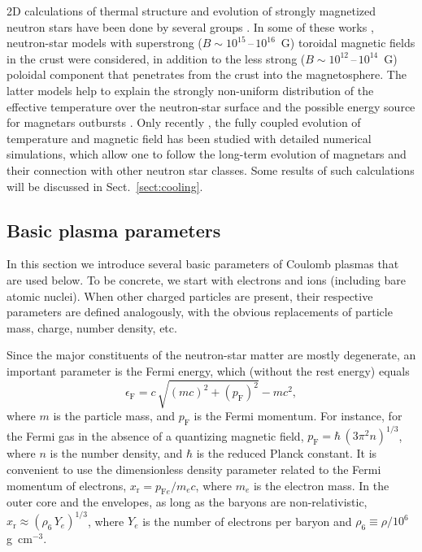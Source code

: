 \documentclass[smallextended]{svjour3}       %
\newcommand{\beq}{\begin{equation}}
\newcommand{\eeq}{\end{equation}}
\newcommand{\EF}{\epsilon_\mathrm{F}}
\newcommand{\mel}{m_e}
\newcommand{\pF}{p_\mathrm{F}}
\newcommand{\pFe}{p_{\mathrm{F}e}}
\newcommand{\xr}{x_\mathrm{r}}
\begin{document}
2D calculations of thermal structure and evolution of
strongly magnetized neutron stars have been done by several 
groups 
\citep{GeppertKP04,GeppertKP06,PerezAMP06,AguileraPM08,Kaminker-ea12,Kaminker-ea14}.
In some of these works
\citep{GeppertKP06,PerezAMP06,AguileraPM08}, neutron-star
models with superstrong ($B\sim10^{15}$\,--\,$10^{16}$~G)
toroidal magnetic fields in the crust were considered, in
addition to the less strong
($B\sim10^{12}$\,--\,$10^{14}$~G) poloidal component that
penetrates from the crust into the magnetosphere. The latter
models help to  explain the strongly non-uniform distribution
of the effective temperature over the neutron-star surface
and the possible energy source for magnetars outbursts
\citep{PonsPerna11,PonsRea12}. Only recently
\citep{vigano13}, the fully coupled evolution of temperature
and magnetic field has been studied with detailed numerical
simulations, which allow one to follow the long-term evolution
of magnetars and  their connection with other neutron star
classes. Some results of such calculations will be discussed
in Sect.~\ref{sect:cooling}.

\subsection{Basic plasma parameters}
\label{sect:param}

In this section we introduce several basic parameters of
Coulomb plasmas that are used below. To be concrete,
we start with electrons and ions (including bare atomic
nuclei). When other charged particles are present, their
respective parameters are defined analogously, with the
obvious replacements of particle mass, charge, number
density, etc.

Since the major constituents of the neutron-star matter are
mostly degenerate, an important parameter is the Fermi
energy, which (without the rest energy) equals 
\beq
   \EF = c\,\sqrt{(m c)^2 + (\pF)^2}-m c^2,
\label{EF}
\eeq
where $m$ is the
particle mass, and $\pF$ is the Fermi
momentum. For instance, for the Fermi gas in the absence of a quantizing
magnetic field, $\pF = \hbar \,(3 \pi^2 n)^{1/3}$, where
$n$ is the number density, and
$\hbar$ is the reduced Planck constant. It is
convenient to use the dimensionless density parameter
related to the Fermi momentum of electrons, 
$\xr  = \pFe / \mel c$, where
$\mel$ is the electron mass. In
the outer core and the envelopes, as long as the baryons are
non-relativistic, $\xr \approx ( \rho_6 \, Y_e )^{1/3}$,
where $Y_e$ is the number of
electrons per baryon and $\rho_6\equiv\rho/10^6$
g~cm$^{-3}$.
\end{document}
